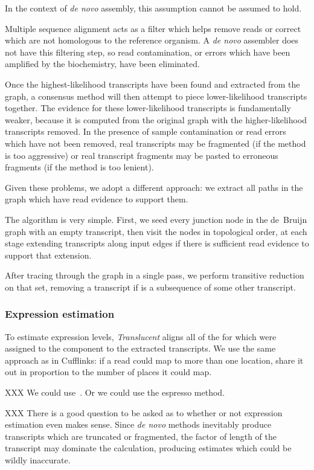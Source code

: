 \documentclass{bioinfo}
\def\Translucent{\textit{Translucent}}
\def\denovo{\textit{de novo}}
\begin{document}
In the context of \denovo{} assembly, this assumption cannot be
assumed to hold.

Multiple sequence alignment acts as a filter which helps remove
reads or correct which are not homologous to the reference organism.
A \denovo{} assembler does not have this filtering step, so
read contamination, or errors which have been amplified
by the biochemistry, have been eliminated.

Once the highest-likelihood transcripts have been found and extracted
from the graph, a consensus method will then attempt to piece
lower-likelihood transcripts together.
The evidence for these lower-likelihood transcripts is fundamentally
weaker, because it is computed from the original graph with the
higher-likelihood transcripts removed.
In the presence of sample contamination or read errors which have
not been removed, real transcripts may be fragmented (if
the method is too aggressive) or real transcript fragments may
be pasted to erroneous fragments (if the method is too lenient).

Given these problems, we adopt a different approach: we extract all
paths in the graph which have read evidence to support them.

The algorithm is very simple. First, we seed every junction node in the
de~Bruijn graph with an empty transcript, then visit the nodes in
topological order, at each stage extending transcripts along input
edges if there is sufficient read evidence to support that extension.

After tracing through the graph in a single pass, we perform
transitive reduction on that set, removing a transcript if is
a subsequence of some other transcript.

\subsubsection{Expression estimation}

To estimate expression levels, \Translucent{} aligns all of the
for which were assigned to the component to the extracted transcripts.
We use the same approach as in Cufflinks: if a read could map to
more than one location, share it out in proportion to the number
of places it could map.

XXX We could use~\cite{Li:2010}. Or we could use the espresso method.

XXX There is a good question to be asked as to whether or not expression
estimation even makes sense.
Since \denovo{} methods inevitably produce transcripts which are truncated
or fragmented, the factor of length of the transcript may dominate
the calculation, producing estimates which could be wildly inaccurate.
\end{document}
